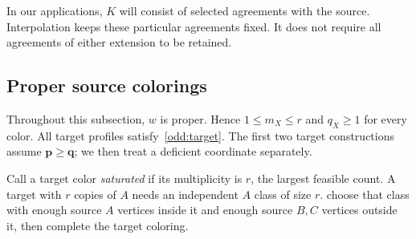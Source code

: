 \documentclass[10pt,a4paper]{amsart}
\numberwithin{equation}{section}
\theoremstyle{definition}
\theoremstyle{remark}
\begin{document}
In our applications, $K$ will consist of selected agreements with the
source. Interpolation keeps these particular agreements fixed. It does
not require all agreements of either extension to be retained.

\subsection{Proper source colorings}

Throughout this subsection, $w$ is proper. Hence
$1\le m_X\le r$ and $q_X\ge1$ for every color. All target profiles
satisfy~\eqref{odd:target}. The first two target constructions assume
$\mathbf p\ge\mathbf q$; we then treat a deficient coordinate separately.

Call a target color \emph{saturated} if its multiplicity is $r$,
the largest feasible count. A target with $r$ copies of $A$ needs an independent $A$ class of size
$r$.  choose that class with enough source $A$
vertices inside it and enough source $B,C$ vertices outside it, then
complete the target coloring.
\end{document}
